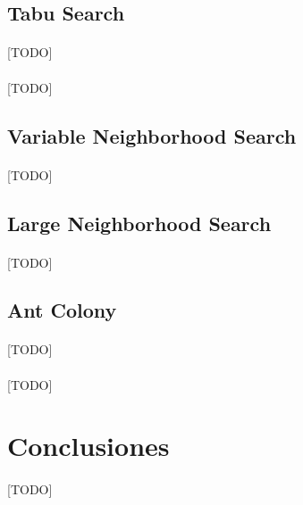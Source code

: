 \documentclass{subfiles}
\begin{document}
      \subsection{Tabu Search}
      \label{sec:solving_tabu}

        \paragraph{}
        [TODO]

        \paragraph{}
        [TODO]

      \subsection{Variable Neighborhood Search}
      \label{sec:solving_vns}

        \paragraph{}
        [TODO]

      \subsection{Large Neighborhood Search}
      \label{sec:solving_lns}

        \paragraph{}
        [TODO]

      \subsection{Ant Colony}
      \label{sec:solving_ant_colony}

        \paragraph{}
        [TODO]

      \paragraph{}
      [TODO]

    \section{Conclusiones}
    \label{sec:solving_conclusions}

      \paragraph{}
      [TODO]
\end{document}
